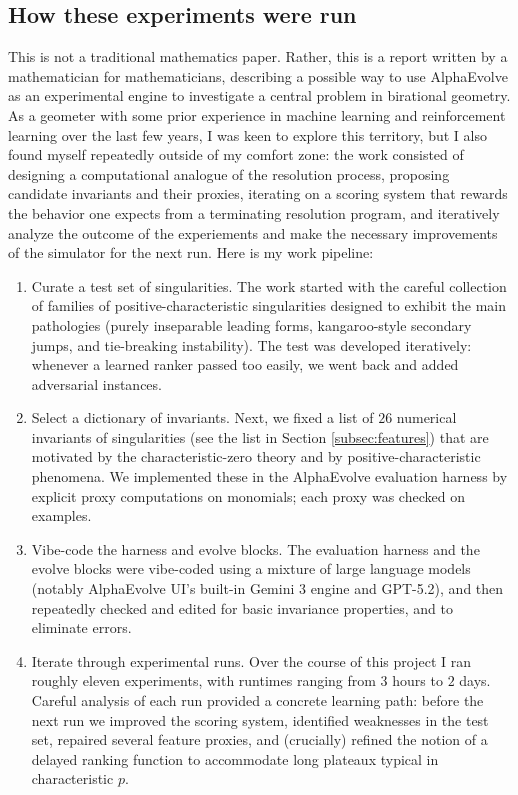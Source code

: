 \documentclass[11pt]{amsart}
\begin{document}
\subsection*{How these experiments were run}
\label{sec:how-run}

This is not a traditional mathematics paper.
Rather, this is a report written by a mathematician for mathematicians, describing a possible way to use AlphaEvolve as an experimental engine to investigate a central problem in birational geometry.
As a geometer with some prior experience in machine learning and reinforcement learning over the last few years, I was keen to explore this territory, but I also found myself repeatedly outside of my comfort zone: the work consisted of designing a computational analogue of the resolution process, proposing candidate invariants and their proxies, iterating on a scoring system that rewards the behavior one expects from a terminating resolution program, and iteratively analyze the outcome of the experiements and make the necessary improvements of the simulator for the next run. 
Here is my work pipeline:
\begin{enumerate}
  \item Curate a test set of singularities.
  The work started with the careful collection of families of positive-characteristic singularities designed to exhibit the main pathologies (purely inseparable leading forms, kangaroo-style secondary jumps, and tie-breaking instability).
  The test was developed iteratively: whenever a learned ranker passed too easily, we went back and added adversarial instances.

  \item Select a dictionary of invariants.
  Next, we fixed a list of $26$ numerical invariants of singularities (see the list in Section \ref{subsec:features}) that are motivated by the characteristic-zero theory and by positive-characteristic phenomena. 
  We implemented these in the AlphaEvolve evaluation harness by explicit proxy computations on monomials; each proxy was checked on examples.

  \item Vibe-code the harness and evolve blocks.
  The evaluation harness and the evolve blocks were vibe-coded using a mixture of large language models (notably AlphaEvolve UI's built-in Gemini 3 engine and GPT-5.2), and then repeatedly checked and edited for basic invariance properties, and to eliminate errors.
  
  \item Iterate through experimental runs.
  Over the course of this project I ran roughly eleven experiments, with runtimes ranging from $3$ hours to $2$ days.  Careful analysis of each run provided a concrete learning path: before the next run we improved the scoring system, identified weaknesses in the test set, repaired several feature proxies, and (crucially) refined the notion of a delayed ranking function to accommodate long plateaux typical in characteristic $p$.
\end{enumerate}
\end{document}

